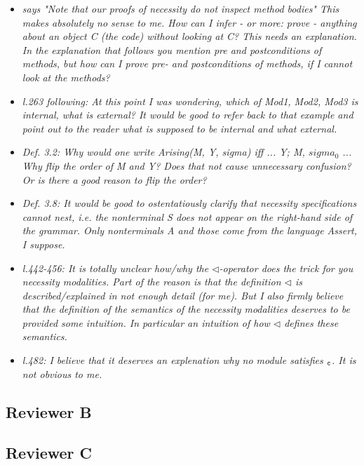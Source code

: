 \documentclass[11pt]{amsart}
\begin{document}
\begin{itemize}
\item
\emph{
says "Note that our proofs of necessity do not inspect method bodies" This makes absolutely no sense to me. How can I infer - or more: prove - anything about an object C (the code) without looking at C? This needs an explanation. In the explanation that follows you mention pre and postconditions of methods, but how can I prove pre- and postconditions of methods, if I cannot look at the methods?
}

\item
\emph{
l.263 following: At this point I was wondering, which of Mod1, Mod2, Mod3 is internal, what is external? It would be good to refer back to that example and point out to the reader what is supposed to be internal and what external.
}

\item
\emph{
Def. 3.2: Why would one write Arising(M, Y, sigma) iff ... Y; M, $sigma_0$ ... Why flip the order of M and Y? Does that not cause unnecessary confusion? Or is there a good reason to flip the order?
}

\item
\emph{
Def. 3.8: It would be good to ostentatiously clarify that necessity specifications cannot nest, i.e. the nonterminal S does not appear on the right-hand side of the grammar. Only nonterminals A and those come from the language Assert, I suppose.
}

\item
\emph{
l.442-456: It is totally unclear how/why the $\triangleleft$-operator does the trick for you necessity modalities. Part of the reason is that the definition $\triangleleft$ is described/explained in not enough detail (for me). But I also firmly believe that the definition of the semantics of the necessity modalities deserves to be provided some intuition. In particular an intuition of how $\triangleleft$ defines these semantics.
}

\item
\emph{
l.482: I believe that it deserves an explenation why no module satisfies $_{\texttt{c}}$. It is not obvious to me.
}
\end{itemize}

\subsection{Reviewer B}

\subsection{Reviewer C}
\end{document}
